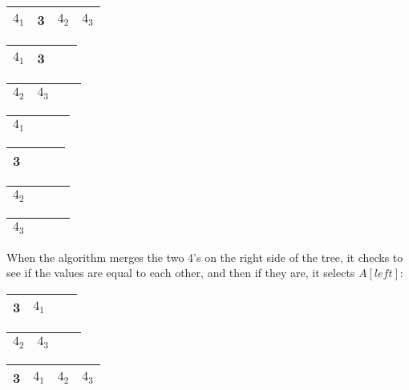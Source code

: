 \documentclass[a4paper,12pt]{article}
\begin{document}
\begin{center}
    \begin{tabular}{| l | l | l | l |}
    \hline
    $4_1$ & 3 & $4_2$ & $4_3$ \\ \hline
    \end{tabular}
\end{center}
\begin{center}
    \begin{tabular}{| l | l | l | l |}
    \hline
    $4_1$ & 3  \\ \hline
    \end{tabular}
\begin{tabular}{| l | l | l | l |}
    \hline
    $4_2$ & $4_3$  \\ \hline
    \end{tabular}
\end{center}
\begin{center}
    \begin{tabular}{| l | l | l | l |}
    \hline
    $4_1$  \\ \hline
    \end{tabular}
\begin{tabular}{| l | l | l | l |}
    \hline
    3  \\ \hline
    \end{tabular}
\begin{tabular}{| l | l | l | l |}
    \hline
    $4_2$  \\ \hline
    \end{tabular}
\begin{tabular}{| l | l | l | l |}
    \hline
    $4_3$  \\ \hline
    \end{tabular}
\end{center}
When the algorithm merges the two $4$'s on the right side of the tree, it checks to see if the values are equal to each other, and then if they are, it selects $A[left]$:\\
\begin{center}
    \begin{tabular}{| l | l | l | l |}
    \hline
    3 & $4_1$  \\ \hline
    \end{tabular}
\begin{tabular}{| l | l | l | l |}
    \hline
    $4_2$ & $4_3$  \\ \hline
    \end{tabular}
\end{center}
\begin{center}
    \begin{tabular}{| l | l | l | l |}
    \hline
    3 & $4_1$ & $4_2$ & $4_3$ \\ \hline
    \end{tabular}
\end{center}
\end{document}
